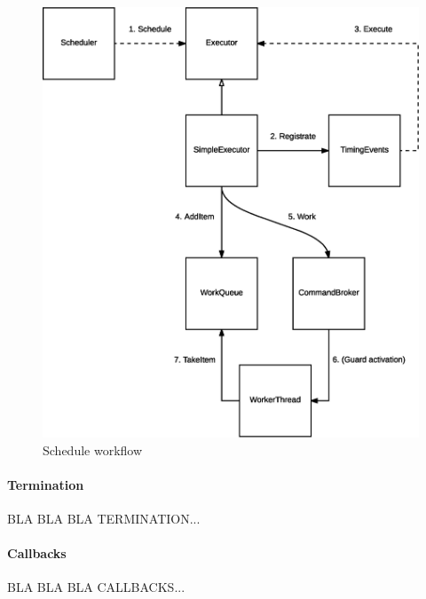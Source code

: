 \begin{figure}[H]
\centering
\includegraphics[scale=0.4,keepaspectratio]{images/solution/app/backend/scheduler.eps}
\caption{Schedule workflow}
\label{fig:schedule-workflow}
\end{figure}

\paragraph{Termination}

BLA BLA BLA TERMINATION...

\paragraph{Callbacks}

BLA BLA BLA CALLBACKS...
